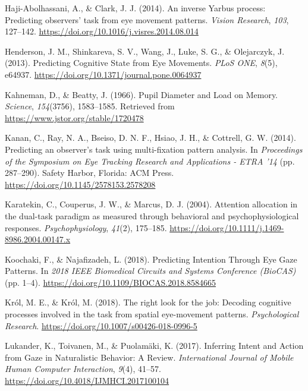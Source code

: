 \documentclass[
  english,
  man,floatsintext]{apa6}
\begin{document}
\leavevmode\hypertarget{ref-haji-abolhassaniInverseYarbusProcess2014}{}%
Haji-Abolhassani, A., \& Clark, J. J. (2014). An inverse Yarbus process: Predicting observers' task from eye movement patterns. \emph{Vision Research}, \emph{103}, 127--142. \url{https://doi.org/10.1016/j.visres.2014.08.014}

\leavevmode\hypertarget{ref-hendersonPredictingCognitiveState2013a}{}%
Henderson, J. M., Shinkareva, S. V., Wang, J., Luke, S. G., \& Olejarczyk, J. (2013). Predicting Cognitive State from Eye Movements. \emph{PLoS ONE}, \emph{8}(5), e64937. \url{https://doi.org/10.1371/journal.pone.0064937}

\leavevmode\hypertarget{ref-kahnemanPupilDiameterLoad1966}{}%
Kahneman, D., \& Beatty, J. (1966). Pupil Diameter and Load on Memory. \emph{Science}, \emph{154}(3756), 1583--1585. Retrieved from \url{https://www.jstor.org/stable/1720478}

\leavevmode\hypertarget{ref-kananPredictingObserverTask2014}{}%
Kanan, C., Ray, N. A., Bseiso, D. N. F., Hsiao, J. H., \& Cottrell, G. W. (2014). Predicting an observer's task using multi-fixation pattern analysis. In \emph{Proceedings of the Symposium on Eye Tracking Research and Applications - ETRA '14} (pp. 287--290). Safety Harbor, Florida: ACM Press. \url{https://doi.org/10.1145/2578153.2578208}

\leavevmode\hypertarget{ref-karatekinAttentionAllocationDualtask2004}{}%
Karatekin, C., Couperus, J. W., \& Marcus, D. J. (2004). Attention allocation in the dual-task paradigm as measured through behavioral and psychophysiological responses. \emph{Psychophysiology}, \emph{41}(2), 175--185. \url{https://doi.org/10.1111/j.1469-8986.2004.00147.x}

\leavevmode\hypertarget{ref-koochakiPredictingIntentionEye2018}{}%
Koochaki, F., \& Najafizadeh, L. (2018). Predicting Intention Through Eye Gaze Patterns. In \emph{2018 IEEE Biomedical Circuits and Systems Conference (BioCAS)} (pp. 1--4). \url{https://doi.org/10.1109/BIOCAS.2018.8584665}

\leavevmode\hypertarget{ref-krolRightLookJob2018}{}%
Król, M. E., \& Król, M. (2018). The right look for the job: Decoding cognitive processes involved in the task from spatial eye-movement patterns. \emph{Psychological Research}. \url{https://doi.org/10.1007/s00426-018-0996-5}

\leavevmode\hypertarget{ref-lukanderInferringIntentAction2017}{}%
Lukander, K., Toivanen, M., \& Puolamäki, K. (2017). Inferring Intent and Action from Gaze in Naturalistic Behavior: A Review. \emph{International Journal of Mobile Human Computer Interaction}, \emph{9}(4), 41--57. \url{https://doi.org/10.4018/IJMHCI.2017100104}
\end{document}
